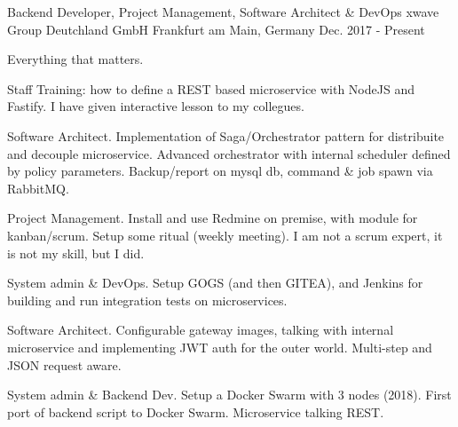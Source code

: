 

\begin{cventries}

  \cventry
    {Backend Developer, Project Management, Software Architect \& DevOps} %
    {xwave Group Deutchland GmbH} %
    {Frankfurt am Main, Germany} %
    {Dec. 2017 - Present} %
    {
      \begin{cvitems} %
        \item {Everything that matters.}
        \item {Staff Training: how to define a REST based microservice with NodeJS and Fastify. I have given interactive lesson to my collegues.}
        \item {Software Architect. Implementation of Saga/Orchestrator pattern for distribuite and decouple microservice. Advanced orchestrator with internal scheduler defined by policy parameters. Backup/report on mysql db, command \& job spawn via RabbitMQ.}
        \item {Project Management. Install and use Redmine on premise, with module for kanban/scrum. Setup some ritual (weekly meeting). I am not a scrum expert, it is not my skill, but I did.}
        \item {System admin \& DevOps. Setup GOGS (and then GITEA), and Jenkins for building and run integration tests on microservices.}
        \item {Software Architect. Configurable gateway images, talking with internal microservice and implementing JWT auth for the outer world. Multi-step and JSON request aware.}
        \item {System admin \& Backend Dev. Setup a Docker Swarm with 3 nodes (2018). First port of backend script to Docker Swarm. Microservice talking REST.}
      \end{cvitems}
    }


\end{cventries}
